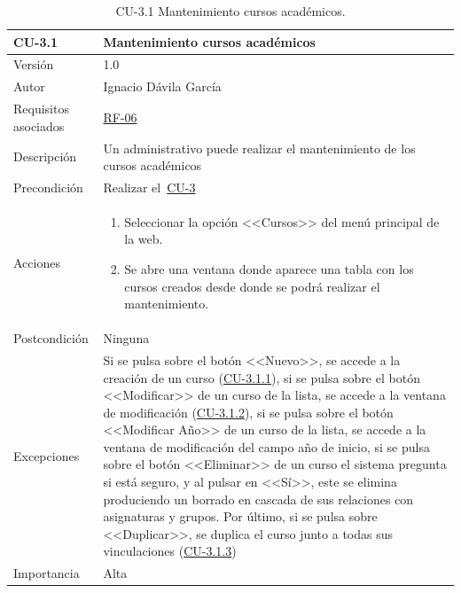 \begin{table}[p]
	\centering
	\begin{tabularx}{\linewidth}{ p{} p{} }
		\toprule
		\textbf{CU-3.1}    & \textbf{Mantenimiento cursos académicos}\\
		\toprule
		{\small Versión}              & 1.0    \\
		{\small Autor}                & Ignacio Dávila García \\
		{\small Requisitos asociados} & \hyperref[itm:RF6]{RF-06} \\
		{\small Descripción}          & Un administrativo puede realizar el mantenimiento de los cursos académicos \\
		{\small Precondición}         & Realizar el~\hyperref[table:CU-3]{CU-3} \\
		{\small Acciones}             &
		\begin{enumerate}
			\def\labelenumi{\arabic{enumi}.}
			\tightlist
			\item Seleccionar la opción <<Cursos>> del menú principal de la web.
			\item Se abre una ventana donde aparece una tabla con los cursos creados desde donde se podrá realizar el mantenimiento.
		\end{enumerate}\\
		{\small Postcondición}        & Ninguna \\
		{\small Excepciones}          & Si se pulsa sobre el botón <<Nuevo>>, se accede a la creación de un curso (\hyperref[table:CU-3_1_1]{CU-3.1.1}), si se pulsa sobre el botón <<Modificar>> de un curso de la lista, se accede a la ventana de modificación (\hyperref[table:CU-3_1_2]{CU-3.1.2}), si se pulsa sobre el botón <<Modificar Año>> de un curso de la lista, se accede a la ventana de modificación del campo año de inicio, si se pulsa sobre el botón <<Eliminar>> de un curso el sistema pregunta si está seguro, y al pulsar en <<Sí>>, este se elimina produciendo un borrado en cascada de sus relaciones con asignaturas y grupos. Por último, si se pulsa sobre <<Duplicar>>, se duplica el curso junto a todas sus vinculaciones  (\hyperref[table:CU-3_1_3]{CU-3.1.3})\\
		{\small Importancia}          & Alta \\
		\bottomrule
	\end{tabularx}
	\caption{CU-3.1 Mantenimiento cursos académicos.}\label{table:CU-3_1}
\end{table}
\FloatBarrier

